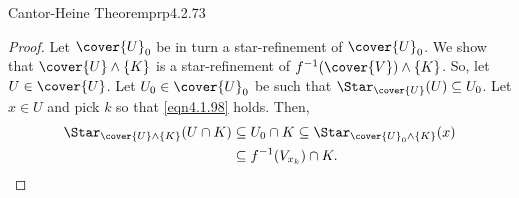 \begin{prp}{Cantor-Heine Theorem}{prp4.2.73}
\begin{proof}
Let $\cover{U}_0$ be in turn a star-refinement of $\cover{U}_0$.  We show that $\cover{U}\wedge \{ K\}$ is a star-refinement of $f^{-1}(\cover{V})\wedge \{ K\}$.  So, let $U\in \cover{U}$.  Let $U_0\in \cover{U}_0$ be such that $\Star _{\cover{U}}(U)\subseteq U_0$.  Let $x\in U$ and pick $k$ so that \eqref{eqn4.1.98} holds.  Then,
\begin{equation}
\begin{split}
\Star _{\cover{U}\wedge \{ K\}}(U\cap K) & \subseteq U_0\cap K\subseteq \Star _{\cover{U}_0\wedge \{ K\}}(x) \\
& \subseteq f^{-1}(V_{x_k})\cap K.
\end{split}
\end{equation}
\end{proof}
\end{prp}

\horizontalrule

